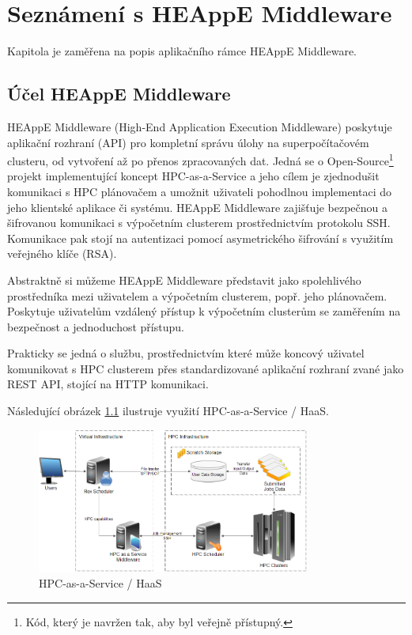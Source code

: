 \chapter{Seznámení s HEAppE Middleware}\label{chapter:chapter-about-heappe-middleware}
Kapitola je zaměřena na popis aplikačního rámce HEAppE Middleware.

\section{Účel HEAppE Middleware}
HEAppE Middleware (High-End Application Execution Middleware) poskytuje aplikační rozhraní (API) pro kompletní správu úlohy na superpočítačovém clusteru, od vytvoření až po přenos zpracovaných dat. Jedná se o Open-Source\footnote{Kód, který je navržen tak, aby byl veřejně přístupný.} projekt implementující koncept HPC-as-a-Service a jeho cílem je zjednodušit komunikaci s HPC plánovačem a umožnit uživateli pohodlnou implementaci do jeho klientské aplikace či systému. HEAppE Middleware zajišťuje bezpečnou a šifrovanou komunikaci s výpočetním clusterem prostřednictvím protokolu SSH. Komunikace pak stojí na autentizaci pomocí asymetrického šifrování s využitím veřejného klíče (RSA).

Abstraktně si můžeme HEAppE Middleware představit jako spolehlivého prostředníka mezi uživatelem a výpočetním clusterem, popř. jeho plánovačem. Poskytuje uživatelům vzdálený přístup k výpočetním clusterům se zaměřením na bezpečnost a jednoduchost přístupu.

Prakticky se jedná o službu, prostřednictvím které může koncový uživatel komunikovat s HPC clusterem přes standardizované aplikační rozhraní zvané jako REST API, stojící na HTTP komunikaci.

Následující obrázek \ref{fig:haas} ilustruje využití HPC-as-a-Service / HaaS.

\begin{figure}
	\centering
	\includegraphics[width=0.8\textwidth]{Figures/haas.png}
	\caption{HPC-as-a-Service / HaaS \cite{uG7wIvjQiIli6kO9}}
	\label{fig:haas}
\end{figure}

